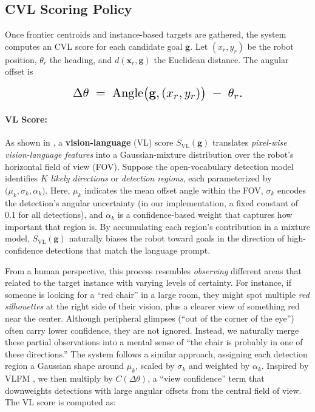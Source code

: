 \subsection{CVL Scoring Policy}

Once frontier centroids and instance-based targets are gathered, the system computes an CVL score for each candidate goal \(\mathbf{g}\). Let \((x_r,y_r)\) be the robot position, \(\theta_r\) the heading, and \(d(\mathbf{x}_r,\mathbf{g})\) the Euclidean distance. The angular offset is

\begin{equation}\label{eq:offset}
\resizebox{0.58\linewidth}{!}{$
\Delta\theta
\;=\;
\mathrm{Angle}\bigl(\mathbf{g},(x_r,y_r)\bigr)
\;-\;\theta_r.
$}
\end{equation}


\paragraph{VL Score:}
As shown in , a \textbf{vision-language} (VL) score \(S_{\mathrm{VL}}(\mathbf{g})\) translates \emph{pixel-wise vision-language features} into a Gaussian-mixture distribution over the robot’s horizontal field of view (FOV). Suppose the open-vocabulary detection model identifies \(K\) \emph{likely directions} or \emph{detection regions}, each parameterized by \(\bigl(\mu_k,\sigma_k,\alpha_k\bigr)\). Here, \(\mu_k\) indicates the mean offset angle within the FOV, \(\sigma_k\) encodes the detection’s angular uncertainty (in our implementation, a fixed constant of \(0.1\) for all detections), and \(\alpha_k\) is a confidence-based weight that captures how important that region is. By accumulating each region’s contribution in a mixture model, \(S_{\mathrm{VL}}(\mathbf{g})\) naturally biases the robot toward goals in the direction of high-confidence detections that match the language prompt.

From a human perspective, this process resembles \emph{observing} different areas that related to the target instance with varying levels of certainty. For instance, if someone is looking for a “red chair” in a large room, they might spot multiple \emph{red silhouettes} at the right side of their vision, plus a clearer view of something red near the center. Although peripheral glimpses (“out of the corner of the eye”) often carry lower confidence, they are not ignored. Instead, we naturally merge these partial observations into a mental sense of “the chair is probably in one of these directions.” The system follows a similar approach, assigning each detection region a Gaussian shape around \(\mu_k\), scaled by \(\sigma_k\) and weighted by \(\alpha_k\). Inspired by VLFM \cite{yokoyama2024vlfm}, we then multiply by \(C(\Delta\theta)\), a ``view confidence'' term that downweights detections with large angular offsets from the central field of view. The VL score is computed as:

